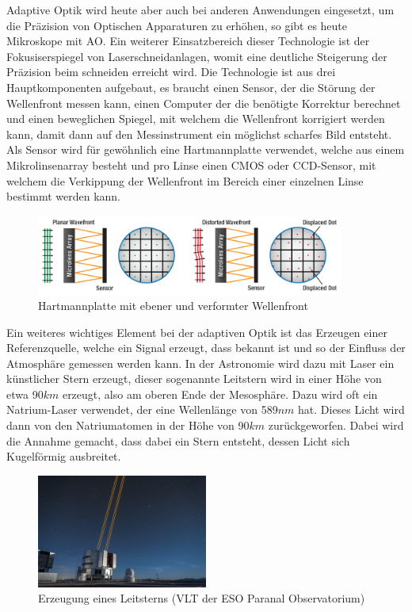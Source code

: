 \begin{refsection}
Adaptive Optik wird heute aber auch bei anderen Anwendungen eingesetzt, um die Präzision von Optischen Apparaturen zu erhöhen, so gibt es heute Mikroskope mit AO. Ein weiterer Einsatzbereich dieser Technologie ist der Fokusiserspiegel von Laserschneidanlagen, womit eine deutliche Steigerung der Präzision beim schneiden erreicht wird.\newline
Die Technologie ist aus drei Hauptkomponenten aufgebaut, es braucht einen Sensor, der die Störung der Wellenfront messen kann, einen Computer der die benötigte Korrektur berechnet und einen beweglichen Spiegel, mit welchem die Wellenfront korrigiert werden kann, damit dann auf den Messinstrument ein möglichst scharfes Bild entsteht.\newline
Als Sensor wird für gewöhnlich eine Hartmannplatte verwendet, welche aus einem Mikrolinsenarray besteht und pro Linse einen CMOS oder CCD-Sensor, mit welchem die Verkippung der Wellenfront im Bereich einer einzelnen Linse bestimmt werden kann. 

\begin{figure}
  \centering
  \includegraphics[width=0.9\textwidth]{adaptiv/images/hartmannplatte}
  \caption{Hartmannplatte mit ebener und verformter Wellenfront
    \cite{thor:hartmannplatte}}
  \label{fig:hartmannplatte}
\end{figure}

Ein weiteres wichtiges Element bei der adaptiven Optik ist das Erzeugen einer Referenzquelle, welche ein Signal erzeugt, dass bekannt ist und so der Einfluss der Atmosphäre gemessen werden kann. In der Astronomie wird dazu mit Laser ein künstlicher Stern erzeugt, dieser sogenannte Leitstern wird in einer Höhe von etwa 90$km$ erzeugt, also am oberen Ende der Mesosphäre. Dazu wird oft ein Natrium-Laser verwendet, der eine Wellenlänge von 589$nm$ hat. Dieses Licht wird dann von den Natriumatomen in der Höhe von 90$km$ zurückgeworfen. Dabei wird die Annahme gemacht, dass dabei ein Stern entsteht, dessen Licht sich Kugelförmig ausbreitet. 

\begin{figure}
  \centering
  \includegraphics[width=0.5\textwidth]{adaptiv/images/Leitstern}
  \caption{Erzeugung eines Leitsterns (VLT der ESO Paranal Observatorium)
    \cite{eso:leitstern}}
  \label{fig:leitstern}
\end{figure}


\end{refsection}
